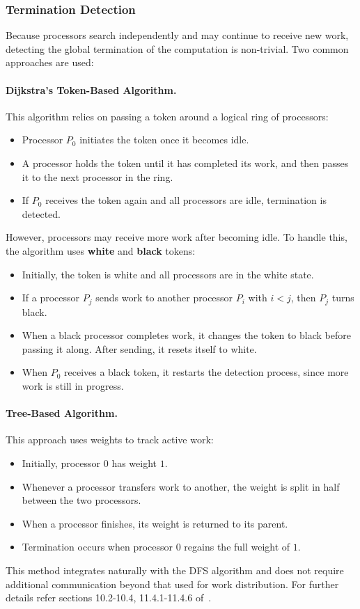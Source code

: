 \documentclass[12pt]{book}
\begin{document}
\subsubsection{Termination Detection}
Because processors search independently and may continue to receive new work, detecting the global termination of the computation is non-trivial. Two common approaches are used:

\paragraph{Dijkstra’s Token-Based Algorithm.}  
This algorithm relies on passing a token around a logical ring of processors:
\begin{itemize}
    \item Processor $P_0$ initiates the token once it becomes idle.  
    \item A processor holds the token until it has completed its work, and then passes it to the next processor in the ring.  
    \item If $P_0$ receives the token again and all processors are idle, termination is detected.  
\end{itemize}
However, processors may receive more work after becoming idle. To handle this, the algorithm uses \textbf{white} and \textbf{black} tokens:  
\begin{itemize}
    \item Initially, the token is white and all processors are in the white state.  
    \item If a processor $P_j$ sends work to another processor $P_i$ with $i < j$, then $P_j$ turns black.  
    \item When a black processor completes work, it changes the token to black before passing it along. After sending, it resets itself to white.  
    \item When $P_0$ receives a black token, it restarts the detection process, since more work is still in progress.  
\end{itemize}

\paragraph{Tree-Based Algorithm.}  
This approach uses weights to track active work:  
\begin{itemize}
    \item Initially, processor $0$ has weight $1$.  
    \item Whenever a processor transfers work to another, the weight is split in half between the two processors.  
    \item When a processor finishes, its weight is returned to its parent.  
    \item Termination occurs when processor $0$ regains the full weight of $1$.  
\end{itemize}
This method integrates naturally with the DFS algorithm and does not require additional communication beyond that used for work distribution. 
For further details refer sections 10.2-10.4, 11.4.1-11.4.6 of~\cite{kumar1994introduction}.
\end{document}
